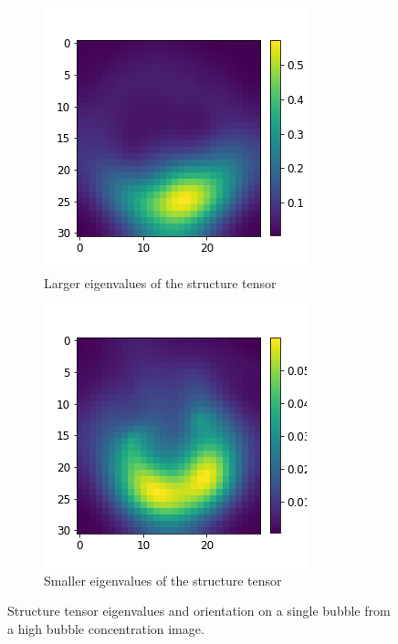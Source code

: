 \begin{figure}
			\begin{subfigure}[t]{.4\textwidth}
				\includegraphics[scale=0.5]{images/larger_ev.png}
				\caption{Larger eigenvalues of the structure tensor}		
				\label{subfig:larger_ev}
			\end{subfigure}\hfill
			\begin{subfigure}[t]{.4\textwidth}
				\includegraphics[scale=0.5]{images/smaller_ev.png}
				\caption{Smaller eigenvalues of the structure tensor }
				\label{subfig:smaller_ev}
			\end{subfigure}			
			\caption{Structure tensor eigenvalues and orientation on a single bubble from a high bubble concentration image.}
			\label{fig:struct_tensor_result}
		\end{figure}
		
